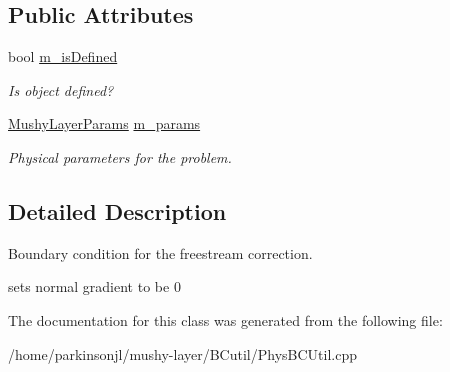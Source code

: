 \subsection*{Public Attributes}
\begin{DoxyCompactItemize}
\item 
\hypertarget{class_freestream_corr_b_c_function_ad6be36c1cc74d3b57f0e4e281facbb8b}{bool \hyperlink{class_freestream_corr_b_c_function_ad6be36c1cc74d3b57f0e4e281facbb8b}{m\-\_\-is\-Defined}}\label{class_freestream_corr_b_c_function_ad6be36c1cc74d3b57f0e4e281facbb8b}

\begin{DoxyCompactList}\small\item\em Is object defined? \end{DoxyCompactList}\item 
\hypertarget{class_freestream_corr_b_c_function_a263cee88a84aca937425bc75a14db918}{\hyperlink{class_mushy_layer_params}{Mushy\-Layer\-Params} \hyperlink{class_freestream_corr_b_c_function_a263cee88a84aca937425bc75a14db918}{m\-\_\-params}}\label{class_freestream_corr_b_c_function_a263cee88a84aca937425bc75a14db918}

\begin{DoxyCompactList}\small\item\em Physical parameters for the problem. \end{DoxyCompactList}\end{DoxyCompactItemize}


\subsection{Detailed Description}
Boundary condition for the freestream correction. 

sets normal gradient to be 0 

The documentation for this class was generated from the following file\-:\begin{DoxyCompactItemize}
\item 
/home/parkinsonjl/mushy-\/layer/\-B\-Cutil/Phys\-B\-C\-Util.\-cpp\end{DoxyCompactItemize}
